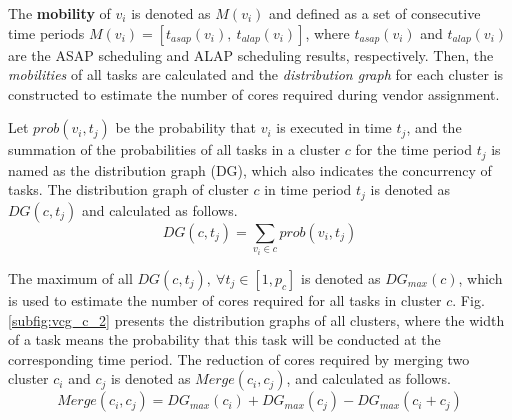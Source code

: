 \documentclass[10pt,journal]{IEEEtran}
\begin{document}


The \textbf{mobility} of $v_{i}$ is denoted as $M(v_i)$ and defined as a set of consecutive time periods $M(v_{i})=[t_{asap}(v_{i}),~t_{alap}(v_{i})]$, where $t_{asap}(v_i)$ and $t_{alap}(v_i)$ are the ASAP scheduling and ALAP scheduling results, respectively. Then, the \textit{mobilities} of all tasks are calculated and the \textit{distribution graph} \cite{article:PP} for each cluster is constructed to estimate the number of cores required during vendor assignment.

Let $prob(v_i,t_j)$ be the probability that $v_i$ is executed in time $t_j$, and the summation of the probabilities of all tasks in a cluster $c$ for the time period $t_j$ is named as the distribution graph (DG), which also indicates the concurrency of tasks. The distribution graph of cluster $c$ in time period $t_j$ is denoted as $DG(c, t_j)$ and calculated as follows.
\begin{equation}
DG(c, t_j) = \sum \limits_{v_i\in c} prob(v_i, t_j)
\end{equation}


The maximum of all $DG(c, t_j), ~\forall t_j\in[1, p_c]$ is denoted as $DG_{max}(c)$, which is used to estimate the number of cores required for all tasks in cluster $c$. Fig. \ref{subfig:vcg_c_2} presents the distribution graphs of all clusters, where the width of a task means the probability that this task will be conducted at the corresponding time period. The reduction of cores required by merging two cluster $c_i$ and $c_j$ is denoted as $Merge(c_i, c_j)$, and calculated as follows.
\begin{equation}
Merge(c_i, c_j) = DG_{max}(c_i) + DG_{max}(c_j) - DG_{max}(c_i+c_j)
\label{equ:weight_e2}
\end{equation}
\end{document}
